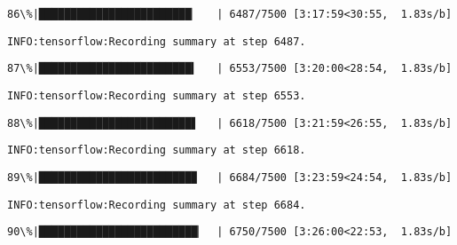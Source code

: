 \documentclass[11pt]{article}
\begin{document}
    \begin{Verbatim}[commandchars=\\\{\}]
 86\%|████████████████████████▏   | 6487/7500 [3:17:59<30:55,  1.83s/b]
    \end{Verbatim}

    \begin{Verbatim}[commandchars=\\\{\}]
INFO:tensorflow:Recording summary at step 6487.

    \end{Verbatim}

    \begin{Verbatim}[commandchars=\\\{\}]
 87\%|████████████████████████▍   | 6553/7500 [3:20:00<28:54,  1.83s/b]
    \end{Verbatim}

    \begin{Verbatim}[commandchars=\\\{\}]
INFO:tensorflow:Recording summary at step 6553.

    \end{Verbatim}

    \begin{Verbatim}[commandchars=\\\{\}]
 88\%|████████████████████████▋   | 6618/7500 [3:21:59<26:55,  1.83s/b]
    \end{Verbatim}

    \begin{Verbatim}[commandchars=\\\{\}]
INFO:tensorflow:Recording summary at step 6618.

    \end{Verbatim}

    \begin{Verbatim}[commandchars=\\\{\}]
 89\%|████████████████████████▉   | 6684/7500 [3:23:59<24:54,  1.83s/b]
    \end{Verbatim}

    \begin{Verbatim}[commandchars=\\\{\}]
INFO:tensorflow:Recording summary at step 6684.

    \end{Verbatim}

    \begin{Verbatim}[commandchars=\\\{\}]
 90\%|█████████████████████████▏  | 6750/7500 [3:26:00<22:53,  1.83s/b]
    \end{Verbatim}
\end{document}
